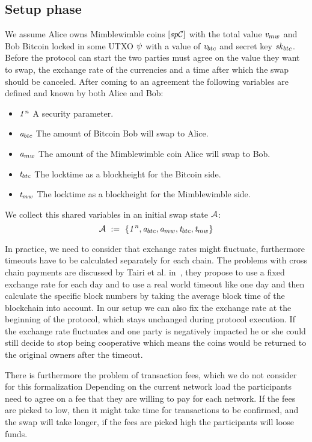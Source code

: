 \subsection{Setup phase}\label{subsec:atom:setup}

We assume Alice owns Mimblewimble coins $[\mathit{sp}\mathcal{C}]$ with the total value $\mathit{v}_{mw}$ and Bob
Bitcoin locked in some UTXO $\psi$ with a value of $\mathit{v}_{btc}$ and secret key $\mathit{sk}_{btc}$.
Before the protocol can start the two parties must agree on the value they want to swap, the exchange rate of the currencies and a time after which the swap should be canceled.
After coming to an agreement the following variables are defined and known by both Alice and Bob:
\begin{itemize}
    \item $\mathit{1^n}$ A security parameter.
    \item $\mathit{a}_{btc}$ The amount of Bitcoin Bob will swap to Alice.
    \item $\mathit{a}_{mw}$ The amount of the Mimblewimble coin Alice will swap to Bob.
    \item $\mathit{t}_{btc}$ The locktime as a blockheight for the Bitcoin side.
    \item $\mathit{t}_{mw}$ The locktime as a blockheight for the Mimblewimble side.
\end{itemize}
We collect this shared variables in an initial swap state $\mathcal{A}$:
\[ \mathcal{A} ~:=~ \{ \mathit{1^n}, \mathit{a}_{btc}, \mathit{a}_{mw}, \mathit{t}_{btc}, \mathit{t}_{mw} \} \]

In practice, we need to consider that exchange rates might fluctuate, furthermore timeouts have to be calculated separately for each chain.
The problems with cross chain payments are discussed by Tairi et al. in~\cite{tairi2019a2l}, they propose to use a fixed exchange rate for each day and to use a real world timeout like one day and then calculate the specific block numbers by taking the average block time of the blockchain into account.
In our setup we can also fix the exchange rate at the beginning of the protocol, which stays unchanged during protocol execution.
If the exchange rate fluctuates and one party is negatively impacted he or she could still decide to stop being cooperative which means the coins would be returned to the original owners after the timeout.

There is furthermore the problem of transaction fees, which we do not consider for this formalization
Depending on the current network load the participants need to agree on a fee that they are willing to pay for each network.
If the fees are picked to low, then it might take time for transactions to be confirmed, and the swap will take longer, if the fees are picked high the participants will loose funds.

